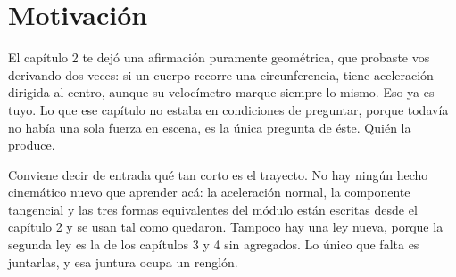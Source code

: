 \documentclass[11pt,openany]{book}
\newcommand{\sen}{\operatorname{sen}}
\renewcommand{\miNombre}{Pedro Villar}
\begin{document}
%
%
%
%


\section{Motivación}

\begin{motivacion}
El capítulo 2 te dejó una afirmación puramente geométrica, que probaste vos derivando dos veces: si un cuerpo recorre una circunferencia, tiene aceleración dirigida al centro, aunque su velocímetro marque siempre lo mismo. Eso ya es tuyo. Lo que ese capítulo no estaba en condiciones de preguntar, porque todavía no había una sola fuerza en escena, es la única pregunta de éste. Quién la produce.
\end{motivacion}

Conviene decir de entrada qué tan corto es el trayecto. No hay ningún hecho cinemático nuevo que aprender acá: la aceleración normal, la componente tangencial y las tres formas equivalentes del módulo están escritas desde el capítulo 2 y se usan tal como quedaron. Tampoco hay una ley nueva, porque la segunda ley es la de los capítulos 3 y 4 sin agregados. Lo único que falta es juntarlas, y esa juntura ocupa un renglón.
\end{document}
